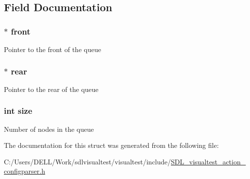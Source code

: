 \subsection{Field Documentation}
\hypertarget{struct_s_d_l_visual_test___action_queue_a8b810b2fd2b05698be642ee08836a452}{
\subsubsection[{front}]{$\ast$ front}}\label{struct_s_d_l_visual_test___action_queue_a8b810b2fd2b05698be642ee08836a452}
Pointer to the front of the queue \hypertarget{struct_s_d_l_visual_test___action_queue_a4aaf4563956932c81c65d05f9020f2ce}{
\subsubsection[{rear}]{$\ast$ rear}}\label{struct_s_d_l_visual_test___action_queue_a4aaf4563956932c81c65d05f9020f2ce}
Pointer to the rear of the queue \hypertarget{struct_s_d_l_visual_test___action_queue_a439227feff9d7f55384e8780cfc2eb82}{
\subsubsection[{size}]{\setlength{\rightskip}{0pt plus 5cm}int size}}\label{struct_s_d_l_visual_test___action_queue_a439227feff9d7f55384e8780cfc2eb82}
Number of nodes in the queue 

The documentation for this struct was generated from the following file\-:\begin{DoxyCompactItemize}
\item 
C\-:/\-Users/\-D\-E\-L\-L/\-Work/sdlvisualtest/visualtest/include/\hyperlink{_s_d_l__visualtest__action__configparser_8h}{S\-D\-L\-\_\-visualtest\-\_\-action\-\_\-configparser.\-h}\end{DoxyCompactItemize}

